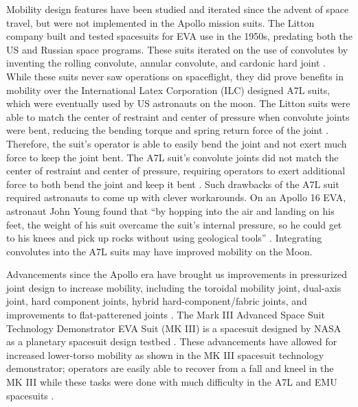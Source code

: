 \documentclass[defaultstyle,11pt]{comps}
\begin{document}
Mobility design features have been studied and iterated since the advent of space travel, but were not implemented in the Apollo mission suits.
The Litton company built and tested spacesuits for EVA use in the 1950s, predating both the US and Russian space programs.
These suits iterated on the use of convolutes by inventing the rolling convolute, annular convolute, and cardonic hard joint \citep{Harris2001}.
While these suits never saw operations on spaceflight, they did prove benefits in mobility over the International Latex Corporation (ILC) designed A7L suits, which were eventually used by US astronauts on the moon.
The Litton suits were able to match the center of restraint and center of pressure when convolute joints were bent, reducing the bending torque and spring return force of the joint \citep{Harris2001}.
Therefore, the suit's operator is able to easily bend the joint and not exert much force to keep the joint bent.
The A7L suit's convolute joints did not match the center of restraint and center of pressure, requiring operators to exert additional force to both bend the joint and keep it bent \citep{Harris2001}.
Such drawbacks of the A7L suit required astronauts to come up with clever workarounds.
On an Apollo 16 EVA, astronaut John Young found that ``by hopping into the air and landing on his feet, the weight of his suit overcame the suit's internal pressure, so he could get to his knees and pick up rocks without using geological tools'' \citep{Portree1997}.
Integrating convolutes into the A7L suits may have improved mobility on the Moon.

Advancements since the Apollo era have brought us improvements in pressurized joint design to increase mobility, including the toroidal mobility joint, dual-axis joint, hard component joints, hybrid hard-component/fabric joints, and improvements to flat-patterened joints \citep{Harris2001}.
The Mark III Advanced Space Suit Technology Demonstrator EVA Suit (MK III) is a spacesuit designed by NASA as a planetary spacesuit design testbed \citep{Kosmo1988}.
These advancements have allowed for increased lower-torso mobility as shown in the MK III spacesuit technology demonstrator; operators are easily able to recover from a fall and kneel in the MK III while these tasks were done with much difficulty in the A7L and EMU spacesuits \citep{Kosmo1998}.
\end{document}
